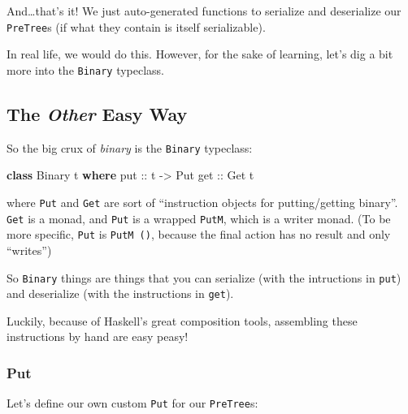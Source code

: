 \documentclass[]{article}
\newenvironment{Shaded}{}{}
\newcommand{\DataTypeTok}[1]{\textcolor[rgb]{0.56,0.13,0.00}{#1}}
\newcommand{\KeywordTok}[1]{\textcolor[rgb]{0.00,0.44,0.13}{\textbf{#1}}}
\newcommand{\NormalTok}[1]{#1}
\newcommand{\OtherTok}[1]{\textcolor[rgb]{0.00,0.44,0.13}{#1}}
\begin{document}
And\ldots{}that's it! We just auto-generated functions to serialize and
deserialize our \texttt{PreTree}s (if what they contain is itself serializable).

In real life, we would do this. However, for the sake of learning, let's dig a
bit more into the \texttt{Binary} typeclass.

\hypertarget{the-other-easy-way}{%
\subsection{\texorpdfstring{The \emph{Other} Easy
Way}{The Other Easy Way}}\label{the-other-easy-way}}

So the big crux of \emph{binary} is the \texttt{Binary} typeclass:

\begin{Shaded}
\begin{Highlighting}[]
\KeywordTok{class} \DataTypeTok{Binary}\NormalTok{ t }\KeywordTok{where}
\OtherTok{    put ::}\NormalTok{ t }\OtherTok{->} \DataTypeTok{Put}
\OtherTok{    get ::} \DataTypeTok{Get}\NormalTok{ t}
\end{Highlighting}
\end{Shaded}

where \texttt{Put} and \texttt{Get} are sort of ``instruction objects for
putting/getting binary''. \texttt{Get} is a monad, and \texttt{Put} is a wrapped
\texttt{PutM}, which is a writer monad. (To be more specific, \texttt{Put} is
\texttt{PutM\ ()}, because the final action has no result and only ``writes'')

So \texttt{Binary} things are things that you can serialize (with the
intructions in \texttt{put}) and deserialize (with the instructions in
\texttt{get}).

Luckily, because of Haskell's great composition tools, assembling these
instructions by hand are easy peasy!

\hypertarget{put}{%
\subsubsection{Put}\label{put}}

Let's define our own custom \texttt{Put} for our \texttt{PreTree}s:
\end{document}
